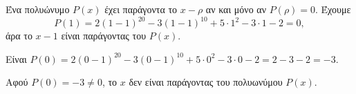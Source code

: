 \begin{alist}
\item Ένα πολυώνυμο $P(x)$ έχει παράγοντα το $x - \rho$ αν και μόνο αν $P(\rho) = 0$. Έχουμε
\[P(1) = 2(1-1)^{20} - 3(1-1)^{10} + 5 \cdot 1^2 - 3 \cdot 1 - 2 = 0,\]
άρα το $x-1$ είναι παράγοντας του $P(x)$.
\item
\begin{rlist}
\item Είναι $P(0) = 2(0-1)^{20} - 3(0-1)^{10} + 5 \cdot 0^2 - 3 \cdot 0 - 2 = 2 - 3 - 2 = -3$.
\item Αφού $P(0) = -3 \ne 0$, το $x$ δεν είναι παράγοντας του πολυωνύμου $P(x)$.
\end{rlist}
\end{alist}

